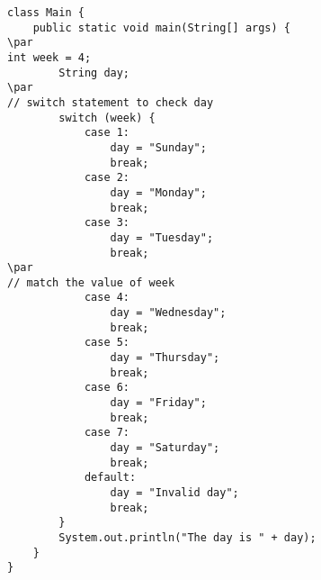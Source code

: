 \documentclass{book}
\def\lthtmlcheckvsize{\ifdim\ht\sizebox<\vsize 
  \ifdim\wd\sizebox<\hsize\expandafter\hfill\fi \expandafter\vfill
  \else\expandafter\vss\fi}%
\begin{document}
{\newpage\clearpage
{}%
\begin{lstlisting}
class Main {
    public static void main(String[] args) {
\par
int week = 4;
        String day;
\par
// switch statement to check day
        switch (week) {
            case 1:
                day = "Sunday";
                break;
            case 2:
                day = "Monday";
                break;
            case 3:
                day = "Tuesday";
                break;
\par
// match the value of week
            case 4:
                day = "Wednesday";
                break;
            case 5:
                day = "Thursday";
                break;
            case 6:
                day = "Friday";
                break;
            case 7:
                day = "Saturday";
                break;
            default:
                day = "Invalid day";
                break;
        }
        System.out.println("The day is " + day);
    }
}
\end{lstlisting}%
\lthtmlfigureZ
\lthtmlcheckvsize\clearpage}
\end{document}
